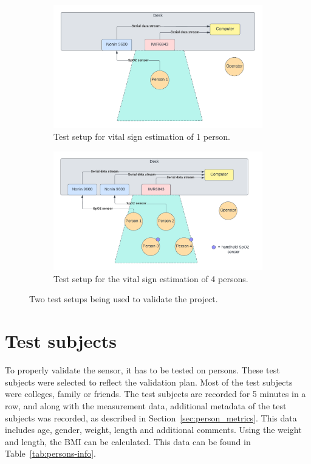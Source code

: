 \begin{figure}[t]
\begin{subfigure}{\textwidth}
  \centering
  \includegraphics[width=.6\linewidth]{figures/validation/test_setup_1.pdf}  
  \caption{Test setup for vital sign estimation of 1 person.}
  \label{fig:test_setup_1}
\end{subfigure}
\begin{subfigure}{\textwidth}
  \centering
  \includegraphics[width=.6\linewidth]{figures/validation/test_setup_4.pdf}  
  \caption{Test setup for the vital sign estimation of 4 persons.}
  \label{fig:test_setup_4}
\end{subfigure}
\caption{Two test setups being used to validate the project.}
\label{fig:test_setup}
\end{figure}

\section{Test subjects}
To properly validate the sensor, it has to be tested on persons. These test subjects were selected to reflect the validation plan. Most of the test subjects were colleges, family or friends. The test subjects are recorded for 5 minutes in a row, and along with the measurement data, additional metadata of the test subjects was recorded, as described in Section~\ref{sec:person_metrics}. This data includes age, gender, weight, length and additional comments. Using the weight and length, the BMI can be calculated. This data can be found in Table~\ref{tab:persons-info}.

